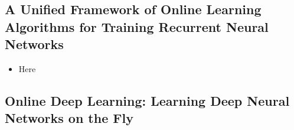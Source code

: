 \documentclass[12pt]{article}
\begin{document}
\subsection{A Unified Framework of Online Learning Algorithms for Training Recurrent Neural Networks \cite{marschall_unified_online}}

\begin{itemize}
\item Here
\end{itemize}

\subsection{Online Deep Learning: Learning Deep Neural Networks on the Fly \cite{sahoo_online}}



\end{document}
